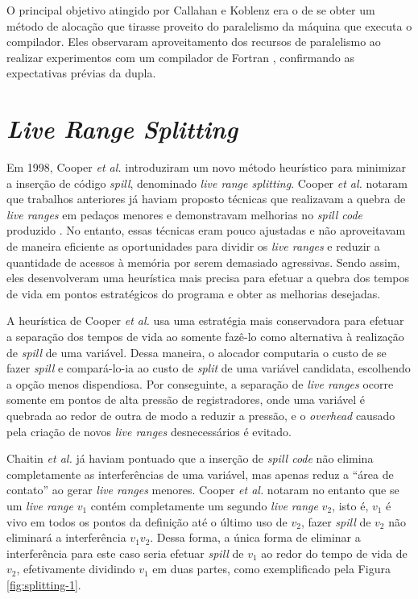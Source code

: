 \documentclass[
	12pt,				%
	openright,			%
	oneside,			%
	a4paper,			%
	tccpreliminar,			%
	]{ABNT-DC-UEL}
\begin{document}
O principal objetivo atingido por Callahan e Koblenz era o de se obter um método de alocação que tirasse proveito do paralelismo da máquina que executa o compilador. Eles observaram aproveitamento dos recursos de paralelismo ao realizar experimentos com um compilador de Fortran \cite{callahan:91}, confirmando as expectativas prévias da dupla.

\section{\textit{Live Range Splitting}}

Em 1998, Cooper \textit{et al.} \cite{cooper:98} introduziram um novo método heurístico para minimizar a inserção de código \textit{spill}, denominado \textit{live range splitting}. Cooper \textit{et al.} notaram que trabalhos anteriores já haviam proposto técnicas que realizavam a quebra de \textit{live ranges} em pedaços menores e demonstravam melhorias no \textit{spill code} produzido \cite{briggs:92, briggs2:92, chow:84}. No entanto, essas técnicas eram pouco ajustadas e não aproveitavam de maneira eficiente as oportunidades para dividir os \textit{live ranges} e reduzir a quantidade de acessos à memória por serem demasiado agressivas. Sendo assim, eles desenvolveram uma heurística mais precisa para efetuar a quebra dos tempos de vida em pontos estratégicos do programa e obter as melhorias desejadas.

A heurística de Cooper \textit{et al.} usa uma estratégia mais conservadora para efetuar a separação dos tempos de vida ao somente fazê-lo como alternativa à realização de \textit{spill} de uma variável. Dessa maneira, o alocador computaria o custo de se fazer \textit{spill} e compará-lo-ia ao custo de \textit{split} de uma variável candidata, escolhendo a opção menos dispendiosa. Por conseguinte, a separação de \textit{live ranges} ocorre somente em pontos de alta pressão de registradores, onde uma variável é quebrada ao redor de outra de modo a reduzir a pressão, e o \textit{overhead} causado pela criação de novos \textit{live ranges} desnecessários é evitado.

Chaitin \textit{et al.} \cite{chaitin:82} já haviam pontuado que a inserção de \textit{spill code} não elimina completamente as interferências de uma variável, mas apenas reduz a ``área de contato'' ao gerar \textit{live ranges} menores. Cooper \textit{et al.} notaram no entanto que se um \textit{live range} $v_1$ contém completamente um segundo \textit{live range} $v_2$, isto é, $v_1$ é vivo em todos os pontos da definição até o último uso de $v_2$, fazer \textit{spill} de $v_2$ não eliminará a interferência $v_1v_2$. Dessa forma, a única forma de eliminar a interferência para este caso seria efetuar \textit{spill} de $v_1$ ao redor do tempo de vida de $v_2$, efetivamente dividindo $v_1$ em duas partes, como exemplificado pela Figura \ref{fig:splitting-1}.
\end{document}
